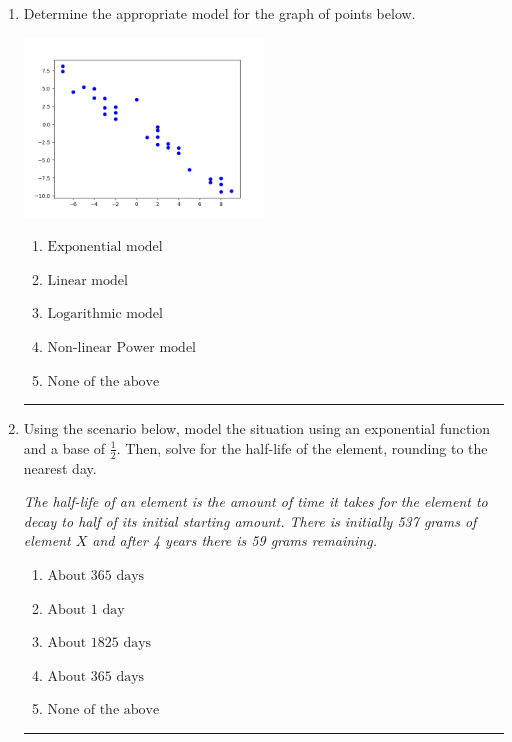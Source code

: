 \documentclass[14pt]{extbook}
\newcommand{\litem}[1]{\item#1\hspace*{-1cm}\rule{\textwidth}{0.4pt}}
\begin{document}
\begin{enumerate}
{\begin{enumerate}[label=\Alph*.]
\end{enumerate} }
\litem{
Determine the appropriate model for the graph of points below.
\begin{center}
    \includegraphics[width=0.5\textwidth]{../Figures/identifyModelGraph11B.png}
\end{center}
\begin{enumerate}[label=\Alph*.]
\item \( \text{Exponential model} \)
\item \( \text{Linear model} \)
\item \( \text{Logarithmic model} \)
\item \( \text{Non-linear Power model} \)
\item \( \text{None of the above} \)

\end{enumerate} }
\litem{
Using the scenario below, model the situation using an exponential function and a base of $\frac{1}{2}$. Then, solve for the half-life of the element, rounding to the nearest day.
\begin{center}
    \textit{ The half-life of an element is the amount of time it takes for the element to decay to half of its initial starting amount. There is initially 537 grams of element $X$ and after 4 years there is 59 grams remaining. }
\end{center}
\begin{enumerate}[label=\Alph*.]
\item \( \text{About } 365 \text{ days} \)
\item \( \text{About } 1 \text{ day} \)
\item \( \text{About } 1825 \text{ days} \)
\item \( \text{About } 365 \text{ days} \)
\item \( \text{None of the above} \)


\end{enumerate}}
\end{enumerate}
\end{document}
